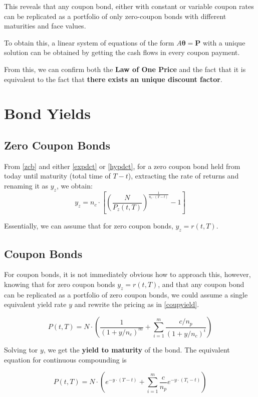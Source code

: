 \documentclass[10pt,letterpaper]{article}
\begin{document}
This reveals that any coupon bond, either with constant or variable coupon rates can be replicated as a portfolio of only zero-coupon bonds with different maturities and face values.

To obtain this, a linear system of equations of the form $A\mathbf{\theta} = \mathbf{P}$ with a unique solution can be obtained by getting the cash flows in every coupon payment.

From this, we can confirm both the \textbf{Law of One Price} and the fact that it is equivalent to the fact that \textbf{there exists an unique discount factor}.

\section{Bond Yields}
\subsection{Zero Coupon Bonds}
From \eqref{zcb} and either \eqref{expdct} or \eqref{hypdct}, for a zero coupon bond held from today until maturity (total time of $T-t$), extracting the rate of returns and renaming it as $y_z$, we obtain:
\begin{equation}\label{zcbyield}
y_z = n_c \cdot \left[\left(\frac{N}{P_z(t,T)}\right)^{\frac{1}{n_c\cdot (T-t)}}-1\right]
\end{equation}

Essentially, we can assume that for zero coupon bonds, $y_z = r(t,T)$.

\subsection{Coupon Bonds}
For coupon bonds, it is not immediately obvious how to approach this, however, knowing that for zero coupon bonds $y_z = r(t,T)$, and that any coupon bond can be replicated as a portfolio of zero coupon bonds, we could assume a single equivalent yield rate $y$ and rewrite the pricing as in \eqref{coupyield}.

\begin{equation}\label{coupyield}
P(t,T) = N \cdot\left(\frac{1}{(1 +y/n_c)^m} + \sum_{i=1}^m\frac{c/n_p}{(1 + y/n_c)^i}\right)
\end{equation}

Solving tor $y$, we get the \textbf{yield to maturity} of the bond. The equivalent equation for continuous compounding is 

\begin{equation}\label{coupyieldcmp}
P(t,T) = N \cdot\left(e^{-y\cdot(T-t)} + \sum_{i=1}^m\frac{c}{n_p} e^{-y\cdot(T_i-t)}\right)
\end{equation}
\end{document}
